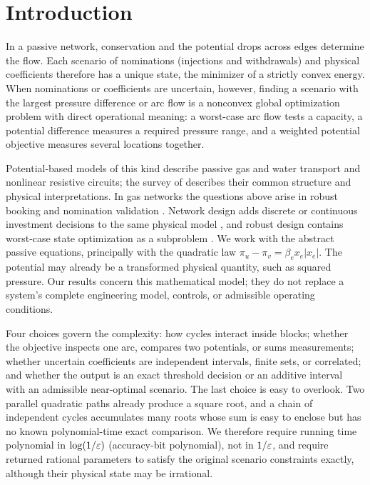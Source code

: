 \section{Introduction}
\label{sec:main-introduction}

In a passive network, conservation and the potential drops across edges
determine the flow. Each scenario of nominations (injections and withdrawals) and
physical coefficients therefore has a unique state, the minimizer of a
strictly convex energy. When nominations or coefficients are uncertain,
however, finding a scenario with the largest pressure difference or arc
flow is a nonconvex global optimization problem with direct operational
meaning: a worst-case arc flow tests a capacity, a potential difference
measures a required pressure range, and a weighted potential objective
measures several locations together.

Potential-based models of this kind describe passive gas and water
transport and nonlinear resistive circuits; the survey of
\citet{pfetsch2026-potential-based-flowsan-overview} describes their common
structure and physical interpretations. In gas networks the questions
above arise in robust booking and nomination validation
\citep{labbe2020-bookings-in-the-european-gas,thurauf2022-deciding-the-feasibility-of-a,amann2018-deciding-robust-feasibility-and-infeasibility}.
Network design adds discrete or continuous investment decisions to the
same physical model
\citep{robinius2019-discrete-sizing,klimm2026-approximating-the-network-design-problem},
and robust design contains worst-case state optimization as a subproblem
\citep{thurauf2025-adjustable-robust-nonlinear-network-design}.
We work with the abstract passive equations, principally with the
quadratic law $\pi_u-\pi_v=\beta_e x_e|x_e|$. The potential may already
be a transformed physical quantity, such as squared pressure. Our results
concern this mathematical model; they do not replace a system's complete
engineering model, controls, or admissible operating conditions.

Four choices govern the complexity: how cycles interact inside blocks;
whether the objective inspects one arc, compares two potentials, or sums
measurements; whether uncertain coefficients are independent intervals,
finite sets, or correlated; and whether the output is an exact threshold
decision or an additive interval with an admissible near-optimal
scenario. The last choice is easy to overlook. Two parallel quadratic
paths already produce a square root, and a chain of independent cycles
accumulates many roots whose sum is easy to enclose but has no known
polynomial-time exact comparison. We therefore require running time
polynomial in $\log(1/\varepsilon)$ (accuracy-bit polynomial), not in
$1/\varepsilon$, and require returned rational parameters to satisfy the
original scenario constraints exactly, although their physical state may
be irrational.

